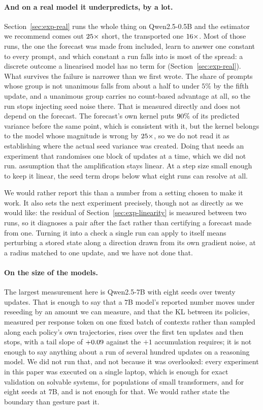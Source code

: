 \paragraph{And on a real model it underpredicts, by a lot.} Section~\ref{sec:exp-real} runs the
whole thing on Qwen2.5-0.5B and the estimator we recommend comes out $25\times$
short, the transported one $16\times$. Most of those runs, the one the forecast was
made from included, learn to answer one constant to every prompt, and which constant a run falls
into is most of the spread: a discrete outcome a linearised model has no term for
(Section~\ref{sec:exp-real}). What survives the failure is narrower than we first wrote. The share of prompts whose group is not unanimous falls from about a half to under
$5\%$ by the fifth update, and a unanimous group carries no count-based advantage at all, so the
run stops injecting seed noise there. That is measured directly and does not depend on the
forecast. The forecast's own kernel puts $90\%$ of its predicted variance
before the same point, which is consistent with it, but the kernel belongs to the model whose
magnitude is wrong by $25\times$, so we do not read it as establishing where the actual seed
variance was created. Doing that needs an experiment that randomises one block of updates at a
time, which we did not run.
assumption that the amplification stays linear. At a step size small enough to keep it
linear, the seed term drops below what eight runs can resolve at all.

We would rather report this than a number from a setting chosen to make it work. It also sets the
next experiment precisely, though not as directly as we would like: the residual of
Section~\ref{sec:exp-linearity} is measured between two runs, so it diagnoses a pair after the fact
rather than certifying a forecast made from one. Turning it into a check a single run can apply to
itself means perturbing a stored state along a direction drawn from its own gradient noise, at a
radius matched to one update, and we have not done that.

\paragraph{On the size of the models.} The largest measurement here is Qwen2.5-7B with eight seeds
over twenty updates. That is enough to say that a $7$B model's reported number moves under
reseeding by an amount we can measure, and that the KL between its policies, measured per response
token on one fixed batch of contexts rather than sampled along each policy's own trajectories,
rises over the first ten
updates and then stops, with a tail slope of $+0.09$ against the $+1$ accumulation
requires; it is not enough to say anything about a run of several hundred updates on a reasoning
model. We did not run
that, and not because it was overlooked: every experiment in this paper was executed on a single
laptop, which is enough for exact validation on solvable systems, for populations of small
transformers, and for eight seeds at $7$B, and is not enough for that. We would rather state the
boundary than gesture past it.

